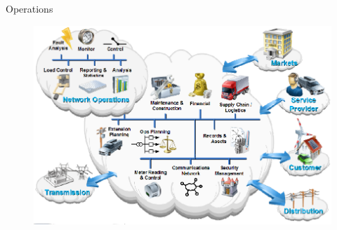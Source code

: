 \begin{frame}[fragile]{Operations}
	\begin{figure}[h] 
		\includegraphics[scale=0.45]{imgs/ope.png}
	\end{figure}
\end{frame}









